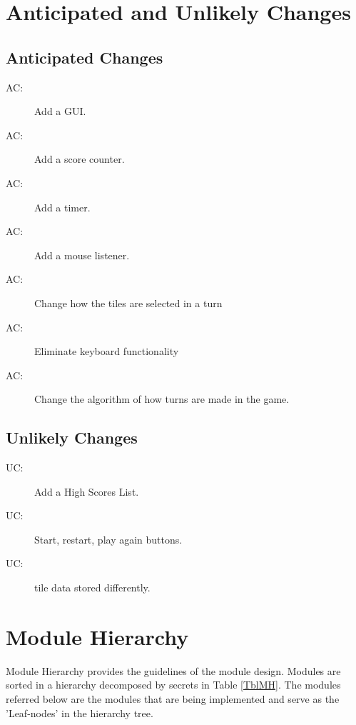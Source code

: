 \documentclass[12pt]{article}
\newcounter{acnum}
\newcommand{\actheacnum}{AC\theacnum}
\newcounter{ucnum}
\newcommand{\uctheucnum}{UC\theucnum}
\begin{document}
\section{Anticipated and Unlikely Changes}\label{SecChange}

\subsection{Anticipated Changes}\label{SecAChange}
\begin{description}
\item[ \actheacnum \label{acGUI}:] Add a GUI.
\item[ \actheacnum \label{acScore}:] Add a score counter.
\item[ \actheacnum \label{acTimer}:] Add a timer.
\item[ \actheacnum \label{acMouse}:] Add a mouse listener.
\item[ \actheacnum \label{acSelect}:] Change how the tiles are selected in a turn
\item[ \actheacnum \label{acKeyboard}:] Eliminate keyboard functionality
\item[ \actheacnum \label{acTurn}:] Change the algorithm of how turns are made in the game.
\end{description}

\subsection{Unlikely Changes}
\begin{description}
\item[ \uctheucnum \label{ucHighScore}:] Add a High Scores List.
\item[ \uctheucnum \label{ucButtons}:] Start, restart, play again buttons.
\item[ \uctheucnum \label{ucInput}:] tile data stored differently.
\end{description}


\section{Module Hierarchy} \label{SecMH}

Module Hierarchy provides the guidelines of the module design. Modules are sorted
in a hierarchy decomposed by secrets in Table \ref{TblMH}. The modules referred below are the modules that are being implemented and serve as the 'Leaf-nodes' in the hierarchy tree.
\end{document}
